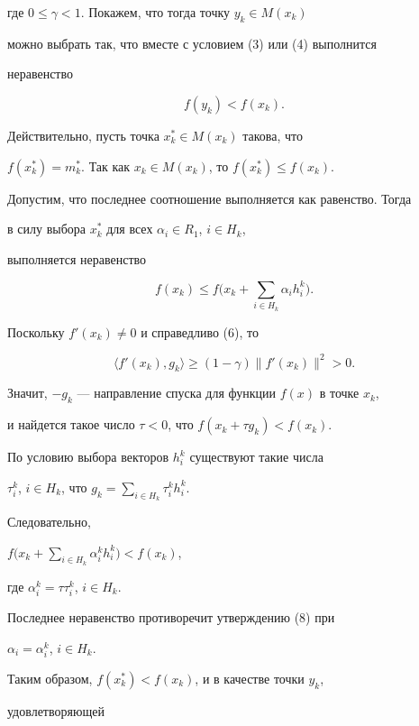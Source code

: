 где $0\leq \gamma <1$. Покажем, что тогда точку $y_k\in M(x_k)$


можно выбрать так, что вместе с условием (3) или (4) выполнится 


неравенство


\begin{equation}


f(y_k)<f(x_k).


\end{equation}


Действительно, пусть точка $x^*_k\in M(x_k)$ такова, что


$f(x^*_k)=m^*_k$. Так как $x_k\in M(x_k)$, то $f(x^*_k)\leq f(x_k)$. 


Допустим, что последнее соотношение выполняется как равенство. Тогда


в силу выбора $x^*_k$ для всех $\alpha_i\in R_1$, $i\in H_k$,


выполняется неравенство


\begin{equation}


f(x_k)\leq f\bigg(x_k+\sum_{i\in H_k}\alpha_i h^k_i\bigg).


\end{equation}


Поскольку $f'(x_k)\neq 0$ и справедливо (6), то


$$


\langle f'(x_k),g_k\rangle\geq (1-\gamma)\|f'(x_k)\|^2>0.


$$


Значит, $-g_k$ --- направление спуска для функции $f(x)$ в точке $x_k$,


и найдется такое число $\tau<0$, что $f(x_k+\tau g_k)<f(x_k)$.


По условию выбора векторов $h^{k}_i$ существуют такие числа


$\tau^k_i$, $i\in H_k$, что $g_k=\sum\limits_{i\in H_k}\tau^k_ih^k_i$.


Следовательно,


$f\Big(x_k+\sum\limits_{i\in H_k}\alpha^k_i h^k_i\Big)<f(x_k)$,


где $\alpha^k_i=\tau\tau^k_i$, $i\in H_k$.


Последнее неравенство противоречит утверждению (8) при


$\alpha_i=\alpha^k_i$, $i\in H_k$.


Таким образом, $f(x^*_k)<f(x_k)$, и в качестве точки $y_k$, 


удовлетворяющей


